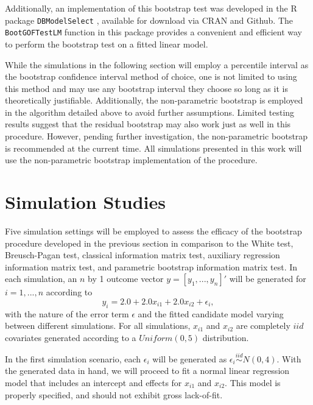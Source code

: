\documentclass[submit]{smj}
\begin{document}
		Additionally, an implementation of this bootstrap test was developed in the R package \texttt{DBModelSelect} \citep{Koeneman}, available for download via CRAN and Github.
		The \texttt{BootGOFTestLM} function in this package provides a convenient and efficient way to perform the bootstrap test on a fitted linear model.
		
		While the simulations in the following section will employ a percentile interval as the bootstrap confidence interval method of choice, one is not limited to using this method
		and may use any bootstrap interval they choose so long as it is theoretically justifiable. Additionally, the non-parametric bootstrap is employed in the algorithm detailed above to avoid further
		assumptions. Limited testing results suggest that the residual bootstrap may also work just as well in this procedure. However, pending further investigation, the non-parametric
		bootstrap is recommended at the current time. All simulations presented in this work will use the non-parametric bootstrap implementation of the procedure.

\section{Simulation Studies}

Five simulation settings will be employed to assess the efficacy of the bootstrap procedure developed in the previous section in comparison to the White test, Breusch-Pagan test, classical information matrix test, auxiliary regression information matrix test, and parametric bootstrap information matrix test. In each simulation, an $n$ by 1 outcome vector $y = [y_1,...,y_n]'$ will
be generated for $i = 1,...,n$ according to
\begin{equation*}
	y_i = 2.0 + 2.0 x_{i1} + 2.0 x_{i2} + \epsilon_i , 
\end{equation*}
with the nature of the error term $\epsilon$ and the fitted candidate model varying between different simulations. For all simulations, $x_{i1}$ and $x_{i2}$ are completely $iid$ covariates generated according to
a $Uniform(0,5)$ distribution.

In the first simulation scenario, each $\epsilon_i$ will be generated as $\epsilon_i \stackrel{iid}{\sim} N(0,4)$. With the generated data in hand, we will proceed to fit a normal linear regression model that includes an intercept and effects for $x_{i1}$ and $x_{i2}$. This model
is properly specified, and should not exhibit gross lack-of-fit.
\end{document}
